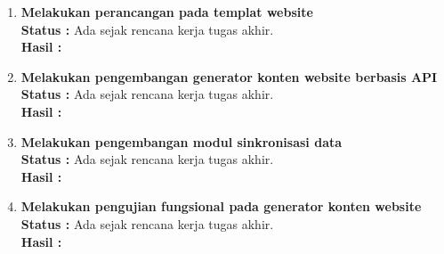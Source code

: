 \begin{enumerate}
    \item \textbf{Melakukan perancangan pada templat website}\\
    {\bf Status :} Ada sejak rencana kerja tugas akhir.\\
    {\bf Hasil :}\\
    

    \item \textbf{Melakukan pengembangan generator konten website berbasis API}\\
    {\bf Status :} Ada sejak rencana kerja tugas akhir.\\
    {\bf Hasil :}\\
    

    \item \textbf{Melakukan pengembangan modul sinkronisasi data}\\
    {\bf Status :} Ada sejak rencana kerja tugas akhir.\\
    {\bf Hasil :}\\
    

    \item \textbf{Melakukan pengujian fungsional pada generator konten website}\\
    {\bf Status :} Ada sejak rencana kerja tugas akhir.\\
    {\bf Hasil :}\\
    
    
\end{enumerate}